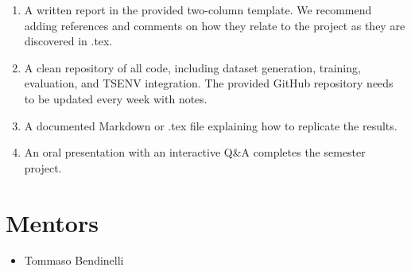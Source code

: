 \documentclass[11pt]{article}
\begin{document}
\begin{enumerate}[label=\arabic*.]
    \item A written report in the provided two-column template. We recommend adding references and comments on how they relate to the project as they are discovered in .tex.
    \item A clean repository of all code, including dataset generation, training, evaluation, and TSENV integration.
    The provided GitHub repository needs to be updated every week with notes.
    \item A documented Markdown or .tex file explaining how to replicate the results.
    \item An oral presentation with an interactive Q\&A completes the semester project.
\end{enumerate}

\section*{Mentors}
\begin{itemize}
    \item Tommaso Bendinelli
\end{itemize}

\ifdefined\tsenvDocsCombinedManualMode
\else
  
  
\fi

\restoregeometry
\pagestyle{fancy}
\endgroup
\end{document}
